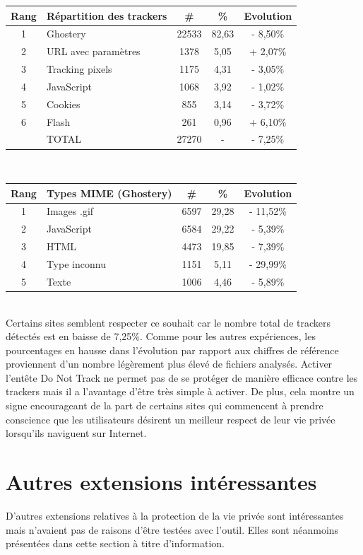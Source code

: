 \begin{tabular}{ c | p{5cm} | c | c || c | }
   Rang & Répartition des trackers & \# & \% & Evolution \\
   \hline
   \hline
   1 & Ghostery & 22533 & 82,63 & - 8,50\% \\
   2 & URL avec paramètres & 1378 & 5,05 & + 2,07\% \\
   3 & Tracking pixels & 1175 & 4,31 & - 3,05\% \\
   4 & JavaScript & 1068 & 3,92 & - 1,02\% \\
   5 & Cookies & 855 & 3,14 & - 3,72\% \\
   6 & Flash & 261 & 0,96 & + 6,10\% \\
   \hline
    & TOTAL & 27270 & - & - 7,25\%\\
   \hline
\end{tabular}
\\[1cm]

\begin{tabular}{ c | p{5cm} | c | c | c | }
   Rang & Types MIME (Ghostery) & \# & \% & Evolution\\
   \hline
   \hline
   1 & Images .gif & 6597 & 29,28 & - 11,52\% \\
   2 & JavaScript & 6584 & 29,22 & - 5,39\% \\
   3 & HTML & 4473 & 19,85 & - 7,39\% \\
   4 & Type inconnu & 1151 & 5,11 & - 29,99\% \\
   5 & Texte & 1006 & 4,46 & - 5,89\% \\
   \hline
\end{tabular}
\\[.3cm]

Certains sites semblent respecter ce souhait car le nombre total de trackers détectés est en baisse de 7,25\%. Comme pour les autres expériences, les pourcentages en hausse dans l'évolution par rapport aux chiffres de référence proviennent d'un nombre légèrement plus élevé de fichiers analysés.
Activer l'entête Do Not Track ne permet pas de se protéger de manière efficace contre les trackers mais il a l'avantage d'être très simple à activer. De plus, cela montre un signe encourageant de la part de certains sites qui commencent à prendre conscience que les utilisateurs désirent un meilleur respect de leur vie privée lorsqu'ils naviguent sur Internet.


\section{Autres extensions intéressantes}
D'autres extensions relatives à la protection de la vie privée sont intéressantes mais n'avaient pas de raisons d'être testées avec l'outil. Elles sont néanmoins présentées dans cette section à titre d'information.

